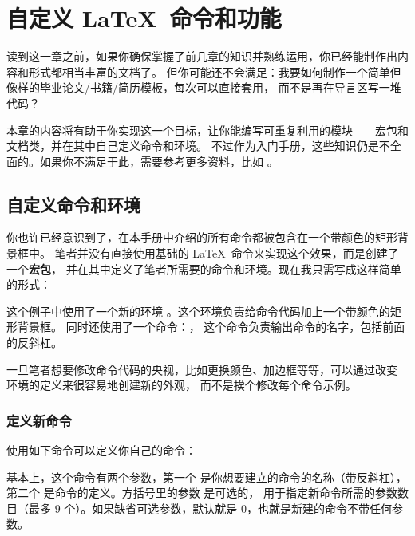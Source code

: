 \chapter{自定义 \LaTeX\ 命令和功能}

\begin{intro}
读到这一章之前，如果你确保掌握了前几章的知识并熟练运用，你已经能制作出内容和形式都相当丰富的文档了。
但你可能还不会满足：我要如何制作一个简单但像样的毕业论文/书籍/简历模板，每次可以直接套用，
而不是再在导言区写一堆代码？

本章的内容将有助于你实现这一个目标，让你能编写可重复利用的模块——宏包和文档类，并在其中自己定义命令和环境。
不过作为入门手册，这些知识仍是不全面的。如果你不满足于此，需要参考更多资料，比如 \cite{companion,clsguide}。
\end{intro}

\section{自定义命令和环境}\label{sec:newcommands}

你也许已经意识到了，在本手册中介绍的所有命令都被包含在一个带颜色的矩形背景框中。
笔者并没有直接使用基础的 \LaTeX\ 命令来实现这个效果，而是创建了一个\textbf{宏包}，
并在其中定义了笔者所需要的命令和环境。现在我只需写成这样简单的形式：

\begin{example}
\begin{command}
\end{command}
\end{example}

这个例子中使用了一个新的环境 。这个环境负责给命令代码加上一个带颜色的矩形背景框。
同时还使用了一个命令：， 这个命令负责输出命令的名字，包括前面的反斜杠。

一旦笔者想要修改命令代码的央视，比如更换颜色、加边框等等，可以通过改变  环境的定义来很容易地创建新的外观，
而不是挨个修改每个命令示例。

\subsection{定义新命令}

使用如下命令可以定义你自己的命令：
\begin{command}
\end{command}
基本上，这个命令有两个参数，第一个  是你想要建立的命令的名称（带反斜杠），
第二个  是命令的定义。方括号里的参数  是可选的，
用于指定新命令所需的参数数目（最多 9 个）。如果缺省可选参数，默认就是 0，也就是新建的命令不带任何参数。

